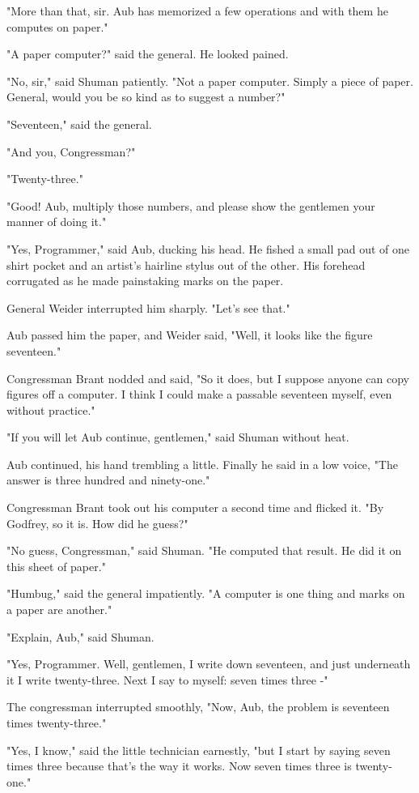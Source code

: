 \documentclass{amsart}
\begin{document}
"More than that, sir. Aub has memorized a few operations and with them
he computes on paper."

"A paper computer?" said the general. He looked pained.

"No, sir," said Shuman patiently. "Not a paper computer. Simply a
piece of paper. General, would you be so kind as to suggest a number?"

"Seventeen," said the general.

"And you, Congressman?"

"Twenty-three."

"Good! Aub, multiply those numbers, and please show the gentlemen your
manner of doing it."

"Yes, Programmer," said Aub, ducking his head. He fished a small pad
out of one shirt pocket and an artist's hairline stylus out of the
other. His forehead corrugated as he made painstaking marks on the
paper.

General Weider interrupted him sharply. "Let's see that."

Aub passed him the paper, and Weider said, "Well, it looks like the
figure seventeen."

Congressman Brant nodded and said, "So it does, but I suppose anyone
can copy figures off a computer. I think I could make a passable
seventeen myself, even without practice."

"If you will let Aub continue, gentlemen," said Shuman without heat.

Aub continued, his hand trembling a little. Finally he said in a low
voice, "The answer is three hundred and ninety-one."

Congressman Brant took out his computer a second time and flicked it.
"By Godfrey, so it is. How did he guess?"

"No guess, Congressman," said Shuman. "He computed that result. He did
it on this sheet of paper."

"Humbug," said the general impatiently. "A computer is one thing and
marks on a paper are another."

"Explain, Aub," said Shuman.

"Yes, Programmer. Well, gentlemen, I write down seventeen, and just
underneath it I write twenty-three. Next I say to myself: seven times
three -"

The congressman interrupted smoothly, "Now, Aub, the problem is
seventeen times twenty-three."

"Yes, I know," said the little technician earnestly, "but I start by
saying seven times three because that's the way it works. Now seven
times three is twenty-one."
\end{document}
